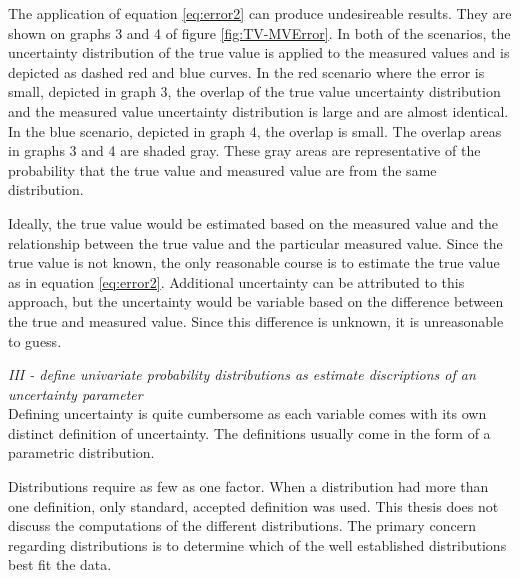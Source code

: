 \begin{linenumbers}
The application of equation \ref{eq:error2} can produce undesireable results.  They are shown on graphs 3 and 4 of figure \ref{fig:TV-MVError}.  In both of the scenarios, the uncertainty distribution of the true value is applied to the measured values and is depicted as dashed red and blue curves.  In the red scenario where the error is small, depicted in graph 3, the overlap of the true value uncertainty distribution and the measured value uncertainty distribution is large and are almost identical.  In the blue scenario, depicted in graph 4, the overlap is small.  The overlap areas in graphs 3 and 4 are shaded gray.  These gray areas are representative of the probability that the true value and measured value are from the same distribution.

Ideally, the true value would be estimated based on the measured value and the relationship between the true value and the particular measured value.  Since the true value is not known, the only reasonable course is to estimate the true value as in equation \ref{eq:error2}.  Additional uncertainty can be attributed to this approach, but the uncertainty would be variable based on the difference between the true and measured value.  Since this difference is unknown, it is unreasonable to guess.

\emph{III - define univariate probability distributions as estimate discriptions of an uncertainty parameter}\\

Defining uncertainty is quite cumbersome as each variable comes with its own distinct definition of uncertainty.  The definitions usually come in the form of a parametric distribution.

Distributions require as few as one factor.  When a distribution had more than one definition, only standard, accepted definition was used.  This thesis does not discuss the computations of the different distributions.  The primary concern regarding distributions is to determine which of the well established distributions best fit the data.





\end{linenumbers}
